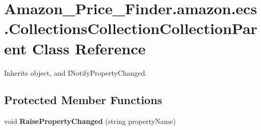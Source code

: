 \hypertarget{class_amazon___price___finder_1_1amazon_1_1ecs_1_1_collections_collection_collection_parent}{\section{Amazon\-\_\-\-Price\-\_\-\-Finder.\-amazon.\-ecs.\-Collections\-Collection\-Collection\-Parent Class Reference}
\label{class_amazon___price___finder_1_1amazon_1_1ecs_1_1_collections_collection_collection_parent}
}


 




Inherits object, and I\-Notify\-Property\-Changed.

\subsection*{Protected Member Functions}
\begin{DoxyCompactItemize}
\item 
\hypertarget{class_amazon___price___finder_1_1amazon_1_1ecs_1_1_collections_collection_collection_parent_a35917900a6389a7b65c6ebd6d1674052}{void {\bfseries Raise\-Property\-Changed} (string property\-Name)}\label{class_amazon___price___finder_1_1amazon_1_1ecs_1_1_collections_collection_collection_parent_a35917900a6389a7b65c6ebd6d1674052}

\end{DoxyCompactItemize}
